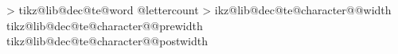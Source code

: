 {    \fi%
    \tikz@lib@dec@te@addmacroto@parameters{\tikz@lib@dec@te@charactercount}{\tikz@lib@dec@te@lettercount}%
    \tikz@lib@dec@te@addmacroto@parameters{\tikz@lib@dec@te@charactercount}{\tikz@lib@dec@te@wordcount}%
    \tikz@lib@dec@te@addmacroto@parameters{\tikz@lib@dec@te@charactercount}{\tikz@lib@dec@te@character}%
    \let\tikz@lib@dec@te@lastcharactercount=\pgfmathcounter%
  \repeatpgfmathloop%
  \let\tikz@lib@dec@te@wordtotal=\tikz@lib@dec@te@wordcount%
  \pgfmathloop
  \ifnum\pgfmathcounter>\tikz@lib@dec@te@charactertotalcount%
  \else%
    \tikz@lib@dec@te@addmacroto@parameters{\pgfmathcounter}{\tikz@lib@dec@te@charactertotalcount}%
    \tikz@lib@dec@te@addmacroto@parameters{\pgfmathcounter}{\tikz@lib@dec@te@wordtotal}%
    \expandafter\let\expandafter\tikz@lib@dec@te@lettertotalcount\expandafter=\csname tikz@lib@dec@te@word \tikz@lib@dec@te@wordcount @lettercount\endcsname%
    \tikz@lib@dec@te@addmacroto@parameters{\pgfmathcounter}{\tikz@lib@dec@te@lettertotalcount}%
  \repeatpgfmathloop%
  \def\tikz@lib@dec@te@textwidth{0pt}%
  \pgfmathloop%
  \ifnum\pgfmathcounter>\tikz@lib@dec@te@charactertotalcount%
  \else%
    \def\tikz@lib@dec@te@characterwidth{0pt}%
    \tikz@lib@dec@te@getcharacterwidth{\pgfmathcounter}%
    \expandafter\let\csname tikz@lib@dec@te@character@\pgfmathcounter @width\endcsname=\tikz@lib@dec@te@characterwidth%
    \pgf@x=\tikz@lib@dec@te@characterwidth\relax%
    \pgf@x%
    \expandafter\edef\csname tikz@lib@dec@te@character@\pgfmathcounter @prewidth\endcsname{\the\pgf@x}%
    \expandafter\edef\csname tikz@lib@dec@te@character@\pgfmathcounter @postwidth\endcsname{\the\pgf@x}%
    \tikz@lib@dec@te@advancedimenmacro{\tikz@lib@dec@te@textwidth}{\tikz@lib@dec@te@characterwidth}%
  \repeatpgfmathloop%
}%

\def\tikz@lib@dec@te@spacetoken{ }%

\let\tikz@lib@dec@te@wordsep=\tikz@lib@dec@te@spacetoken


%
%
%
\def\tikz@lib@dec@te@scancharacters#1{%
  \def\tikz@lib@dec@te@@@scancharacters@process{#1}%
  \def\tikz@lib@dec@te@scancount{0}%
  \expandafter\tikz@lib@dec@te@@scancharacters\tikz@lib@dec@te@text\tikz@lib@dec@te@scancharacters}%

